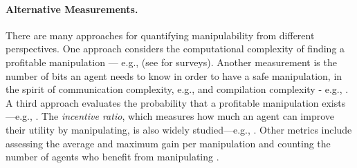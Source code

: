 \paragraph{Alternative Measurements.}
There are many approaches for quantifying manipulability from different perspectives. 
One approach considers the computational complexity of finding a profitable manipulation — e.g., \cite{bartholdi1989computational,bartholdi1991single} (see \cite{faliszewski2010ai,veselova2016computational} for surveys). 
Another measurement is the number of bits
an agent needs to know in order to have a safe manipulation, in the spirit of communication complexity,  e.g., \cite{nisan2002communication, grigorieva2006communication, Communication2019Branzei,Babichenko2019communication} and compilation complexity - e.g., \citep{chevaleyre2009compiling,xia2010compilation,karia2021compilation}.
A third approach evaluates the probability that a profitable manipulation exists —e.g., \cite{barrot2017manipulation,lackner2018approval,lackner2023free}.
The \emph{incentive ratio}, which measures how much an agent can improve their utility by manipulating, is also widely studied—e.g., \cite{chen2011profitable,chen2022incentive,li2024bounding,cheng2022tight,cheng2019improved}. Other metrics include assessing the average and maximum gain per manipulation \cite{aleskerov1999degree} and counting the number of agents who benefit from manipulating \cite{andersson2014budget,andersson2014least}.




